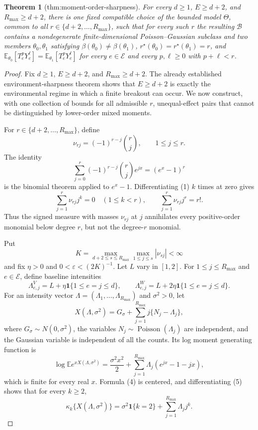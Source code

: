 \documentclass{article}
\newtheorem{theorem}{Theorem}
\begin{document}
\begin{theorem}[thm:moment-order-sharpness]\label{thm:moment-order-sharpness}
For every \(d\geq1\), \(E\geq d+2\), and \(R_{\max}\geq d+2\), there is one fixed compatible choice of the bounded model \(\Theta\), common to all \(r\in\{d+2,\ldots,R_{\max}\}\), such that for every such \(r\) the resulting \(\mathcal B\) contains a nondegenerate finite-dimensional Poisson--Gaussian subclass and two members \(\theta_0,\theta_1\) satisfying \(\beta(\theta_0)\neq\beta(\theta_1)\), \(r^\star(\theta_0)=r^\star(\theta_1)=r\), and \(\mathbb E_{\theta_0}[T_e^pY_e^{\ell}]=\mathbb E_{\theta_1}[T_e^pY_e^{\ell}]\) for every \(e\in\mathcal E\) and every \(p,\ell\geq0\) with \(p+\ell<r\).
\end{theorem}
\begin{proof}
Fix \(d\geq1\), \(E\geq d+2\), and \(R_{\max}\geq d+2\).  The already established environment-sharpness theorem shows that \(E\geq d+2\) is exactly the environmental regime in which a finite breakout can occur.  We now construct, with one collection of bounds for all admissible \(r\), unequal-effect pairs that cannot be distinguished by lower-order mixed moments.

For \(r\in\{d+2,\ldots,R_{\max}\}\), define
\[
 \nu_{rj}=(-1)^{r-j}{r\choose j},\qquad 1\leq j\leq r.
\]
The identity
\[
 \sum_{j=0}^{r}(-1)^{r-j}{r\choose j}e^{jx}=(e^x-1)^r
 \tag{1}
\]
is the binomial theorem applied to \(e^x-1\).  Differentiating (1) \(k\) times at zero gives
\[
 \sum_{j=1}^{r}\nu_{rj}j^k=0\quad(1\leq k<r),
 \qquad
 \sum_{j=1}^{r}\nu_{rj}j^r=r!.
 \tag{2}
\]
Thus the signed measure with masses \(\nu_{rj}\) at \(j\) annihilates every positive-order monomial below degree \(r\), but not the degree-\(r\) monomial.

Put
\[
 K=\max_{d+2\leq s\leq R_{\max}}\max_{1\leq j\leq s}|\nu_{sj}|<\infty
\]
and fix \(\eta>0\) and \(0<\varepsilon<(2K)^{-1}\).  Let \(L\) vary in \([1,2]\).  For \(1\leq j\leq R_{\max}\) and \(e\in\mathcal E\), define baseline intensities
\[
 \Lambda^{V}_{e,j}=L+\eta\mathbf 1\{1\leq e=j\leq d\},
 \qquad
 \Lambda^{W}_{e,j}=L+2\eta\mathbf 1\{1\leq e=j\leq d\}.
 \tag{3}
\]
For an intensity vector \(\Lambda=(\Lambda_1,\ldots,\Lambda_{R_{\max}})\) and \(\sigma^2>0\), let
\[
 X(\Lambda,\sigma^2)
 =G_{\sigma}+
   \sum_{j=1}^{R_{\max}}j\{N_j-\Lambda_j\},
 \tag{4}
\]
where \(G_{\sigma}\sim N(0,\sigma^2)\), the variables \(N_j\sim\operatorname{Poisson}(\Lambda_j)\) are independent, and the Gaussian variable is independent of all the counts.  Its log moment generating function is
\[
 \log\mathbb E e^{xX(\Lambda,\sigma^2)}
 =\frac{\sigma^2x^2}{2}
  +\sum_{j=1}^{R_{\max}}\Lambda_j(e^{jx}-1-jx),
 \tag{5}
\]
which is finite for every real \(x\).  Formula (4) is centered, and differentiating (5) shows that for every \(k\geq2\),
\[
 \kappa_k\{X(\Lambda,\sigma^2)\}
 =\sigma^2\mathbf 1\{k=2\}+
   \sum_{j=1}^{R_{\max}}\Lambda_jj^k.
 \tag{6}
\]


\end{proof}
\end{document}
